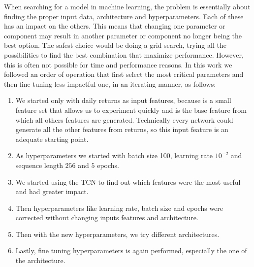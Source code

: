 \hfill

When searching for a model in machine learning, the problem is essentially about finding the proper input data, architecture and hyperparameters. Each of these has an impact on the others. This means that changing one parameter or component may result in another parameter or component no longer being the best option. The safest choice would be doing a grid search, trying all the possibilities to find the best combination that maximize performance. However, this is often not possible for time and performance reasons. In this work we followed an order of operation that first select the most critical parameters and then fine tuning less impactful one, in an iterating manner, as follows:
\begin{enumerate}
    \item We started only with daily returns as input features, because is a small feature set that allows us to experiment quickly and is the base feature from which all others features are generated. Technically every network could generate all the other features from returns, so this input feature is an adequate starting point.
    \item As hyperparameters we started with batch size 100, learning rate $10^{-2}$ and sequence length $256$ and $5$ epochs. 
    \item We started using the TCN to find out which features were the most useful and had greater impact.
    \item Then hyperparameters like learning rate, batch size and epochs were corrected without changing inputs features and architecture.
    \item Then with the new  hyperparameters, we try different architectures.
    \item Lastly, fine tuning hyperparameters is again performed, especially the one of the architecture.
\end{enumerate}

\hfill \break

